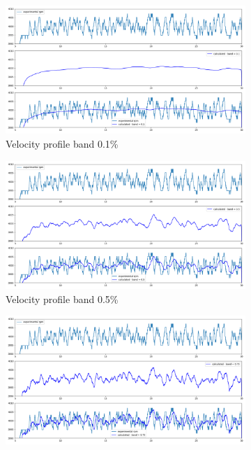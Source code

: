 \documentclass[10pt,fleqn,a4paper,twoside]{article}
\begin{document}
\begin{figure}
    \centering
    \begin{subfigure}{0.4\textwidth}
        \includegraphics[width=\textwidth]{Figures/rpm_analysis_mic0_band_0.1.png}
        \caption{Velocity profile band 0.1\%}
        \label{fig:first}
    \end{subfigure}
    \hfill
    \centering
    \begin{subfigure}{0.4\textwidth}
        \includegraphics[width=\textwidth]{Figures/rpm_analysis_mic0_band_0.5.png}
        \caption{Velocity profile band 0.5\%}
        \label{fig:second}
    \end{subfigure}
    \hfill
    \centering
    \begin{subfigure}{0.4\textwidth}
        \includegraphics[width=\textwidth]{Figures/rpm_analysis_mic0_band_0.75.png}

\end{subfigure}
\end{figure}
\end{document}
